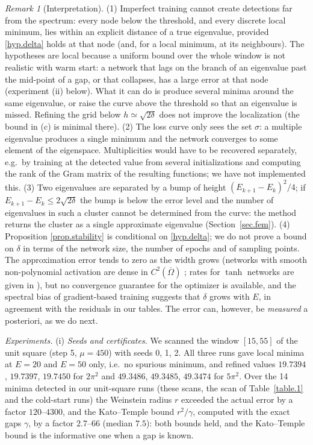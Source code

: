\documentclass[10pt]{amsart}
\newenvironment{revblock}{\color{blue}}{}
\theoremstyle{definition}
\theoremstyle{remark}
\newtheorem{remark}{Remark}
\theoremstyle{plain}
\begin{document}
\begin{revblock}
\begin{remark}[Interpretation]\label{rem.stability}
(1) Imperfect training cannot create detections far from the spectrum: every node below the
threshold, and every discrete local minimum, lies within an explicit distance of a true
eigenvalue, provided \eqref{hyp.delta} holds at that node (and, for a local minimum, at its
neighbours). The hypotheses are local because a uniform bound over the whole window is not realistic
with warm start: a network that lags on the branch of an eigenvalue past the mid-point of a gap, or
that collapses, has a large error at that node (experiment (ii) below). What it can do is produce several minima around the
same eigenvalue, or raise the curve above the threshold so that an eigenvalue is missed. Refining the
grid below $h\simeq\sqrt{2\delta}$ does not improve the localization (the bound in (c) is minimal
there). (2) The loss curve only sees the set $\sigma$: a multiple eigenvalue produces a single
minimum and the network converges to some element of the eigenspace. Multiplicities would have to
be recovered separately, e.g.\ by training at the detected value from several initializations and
computing the rank of the Gram matrix of the resulting functions; we have not implemented this.
(3) Two eigenvalues are separated by a bump of height $(E_{k+1}-E_k)^2/4$; if
$E_{k+1}-E_k\le2\sqrt{2\delta}$ the bump is below the error level and the number of eigenvalues in
such a cluster cannot be determined from the curve: the method returns the cluster as a single
approximate eigenvalue (Section~\ref{sec.fem}). (4) Proposition \ref{prop.stability} is conditional
on \eqref{hyp.delta}; we do not prove a bound on $\delta$ in terms of the network size, the number of
epochs and of sampling points. The approximation error tends to zero as the width grows (networks
with smooth non-polynomial activation are dense in $C^2(\overline\Omega)$
\cite{Hornik1991,Pinkus1999}; rates for $\tanh$ networks are given in
\cite{DeRyck-Lanthaler-Mishra}), but no convergence guarantee for the optimizer is available, and the
spectral bias of gradient-based training \cite{Rahaman-etal} suggests that $\delta$ grows with $E$,
in agreement with the residuals in our tables. The error can, however, be \emph{measured} a
posteriori, as we do next.
\end{remark}

\emph{Experiments.} (i) \emph{Seeds and certificates.} We scanned the window $[15,55]$ of the unit
square (step 5, $\mu=450$) with seeds 0, 1, 2. All three runs gave local minima at $E=20$ and $E=50$
only, i.e.\ no spurious minimum, and refined values $19.7394$, $19.7397$, $19.7450$ for $2\pi^2$ and
$49.3486$, $49.3485$, $49.3474$ for $5\pi^2$. Over the 14 minima detected in our unit-square runs
(these scans, the scan of Table~\ref{table.1} and the cold-start runs) the Weinstein radius $r$
exceeded the actual error by a factor $120$--$4300$, and the Kato--Temple bound $r^2/\gamma$, computed
with the exact gaps $\gamma$, by a factor $2.7$--$66$ (median $7.5$): both bounds held, and the
Kato--Temple bound is the informative one when a gap is known.


\end{revblock}
\end{document}
